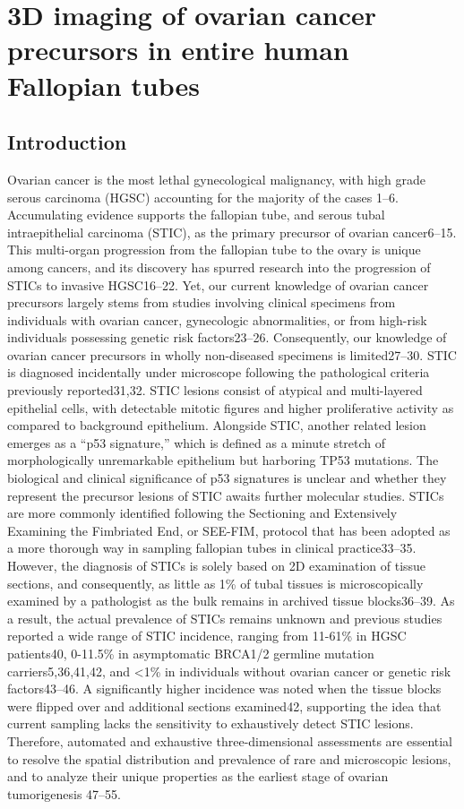 \chapter{3D imaging of ovarian cancer precursors in entire human Fallopian tubes} \label{chap:chap-3}
\begin{refsection}
    
    \section{Introduction}
    Ovarian cancer is the most lethal gynecological malignancy, with high grade serous carcinoma (HGSC) accounting for the majority of the cases \cite{Bowtell2015Rethinking,Kurman2016Dualistic}1–6. Accumulating evidence supports the fallopian tube, and serous tubal intraepithelial carcinoma (STIC), as the primary precursor of ovarian cancer6–15. This multi-organ progression from the fallopian tube to the ovary is unique among cancers, and its discovery has spurred research into the progression of STICs to invasive HGSC16–22. Yet, our current knowledge of ovarian cancer precursors largely stems from studies involving clinical specimens from individuals with ovarian cancer, gynecologic abnormalities, or from high-risk individuals possessing genetic risk factors23–26. Consequently, our knowledge of ovarian cancer precursors in wholly non-diseased specimens is limited27–30.
    STIC is diagnosed incidentally under microscope following the pathological criteria previously reported31,32. STIC lesions consist of atypical and multi-layered epithelial cells, with detectable mitotic figures and higher proliferative activity as compared to background epithelium. Alongside STIC, another related lesion emerges as a “p53 signature,” which is defined as a minute stretch of morphologically unremarkable epithelium but harboring TP53 mutations. The biological and clinical significance of p53 signatures is unclear and whether they represent the precursor lesions of STIC awaits further molecular studies. STICs are more commonly identified following the Sectioning and Extensively Examining the Fimbriated End, or SEE-FIM, protocol that has been adopted as a more thorough way in sampling fallopian tubes in clinical practice33–35. However, the diagnosis of STICs is solely based on 2D examination of tissue sections, and consequently, as little as 1\% of tubal tissues is microscopically examined by a pathologist as the bulk remains in archived tissue blocks36–39. As a result, the actual prevalence of STICs remains unknown and previous studies reported a wide range of STIC incidence, ranging from 11-61\% in HGSC patients40, 0-11.5\% in asymptomatic BRCA1/2 germline mutation carriers5,36,41,42, and <1\% in individuals without ovarian cancer or genetic risk factors43–46.  A significantly higher incidence was noted when the tissue blocks were flipped over and additional sections examined42, supporting the idea that current sampling lacks the sensitivity to exhaustively detect STIC lesions. Therefore, automated and exhaustive three-dimensional assessments are essential to resolve the spatial distribution and prevalence of rare and microscopic lesions, and to analyze their unique properties as the earliest stage of ovarian tumorigenesis 47–55.

\end{refsection}
